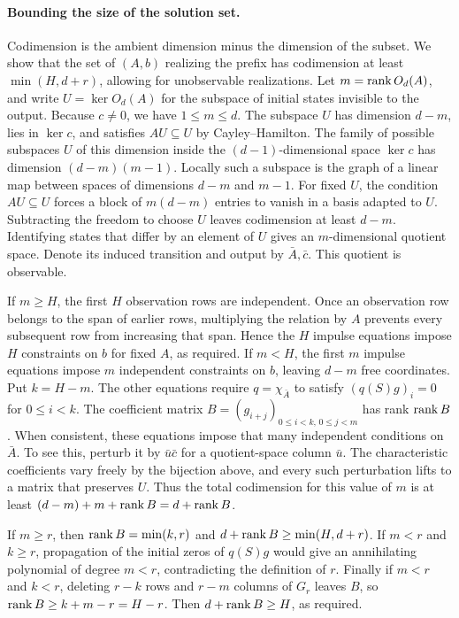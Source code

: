 \paragraph{Bounding the size of the solution set.}
Codimension is the ambient dimension minus the dimension of the subset. We show that the set of \((A,b)\) realizing the prefix has codimension at least \(\min(H,d+r)\), allowing for unobservable realizations. Let \(m=\operatorname{rank} O_d(A)\), and write \(U=\ker O_d(A)\) for the subspace of initial states invisible to the output. Because \(c\ne0\), we have \(1\le m\le d\). The subspace \(U\) has dimension \(d-m\), lies in \(\ker c\), and satisfies \(AU\subseteq U\) by Cayley--Hamilton. The family of possible subspaces \(U\) of this dimension inside the \((d-1)\)-dimensional space \(\ker c\) has dimension \((d-m)(m-1)\). Locally such a subspace is the graph of a linear map between spaces of dimensions \(d-m\) and \(m-1\). For fixed \(U\), the condition \(AU\subseteq U\) forces a block of \(m(d-m)\) entries to vanish in a basis adapted to \(U\). Subtracting the freedom to choose \(U\) leaves codimension at least \(d-m\). Identifying states that differ by an element of \(U\) gives an \(m\)-dimensional quotient space. Denote its induced transition and output by \(\bar A,\bar c\). This quotient is observable.

If \(m\ge H\), the first \(H\) observation rows are independent. Once an observation row belongs to the span of earlier rows, multiplying the relation by \(A\) prevents every subsequent row from increasing that span. Hence the \(H\) impulse equations impose \(H\) constraints on \(b\) for fixed \(A\), as required. If \(m<H\), the first \(m\) impulse equations impose \(m\) independent constraints on \(b\), leaving \(d-m\) free coordinates. Put \(k=H-m\). The other equations require \(q=\chi_{\bar A}\) to satisfy \((q(S)g)_i=0\) for \(0\le i<k\). The coefficient matrix \(B=(g_{i+j})_{0\le i<k,\,0\le j<m}\) has rank \(\operatorname{rank} B\). When consistent, these equations impose that many independent conditions on \(\bar A\). To see this, perturb it by \(\bar u\bar c\) for a quotient-space column \(\bar u\). The characteristic coefficients vary freely by the bijection above, and every such perturbation lifts to a matrix that preserves \(U\). Thus the total codimension for this value of \(m\) is at least \((d-m)+m+\operatorname{rank} B=d+\operatorname{rank} B\).

If \(m\ge r\), then \(\operatorname{rank} B=\min(k,r)\) and \(d+\operatorname{rank} B\ge\min(H,d+r)\). If \(m<r\) and \(k\ge r\), propagation of the initial zeros of \(q(S)g\) would give an annihilating polynomial of degree \(m<r\), contradicting the definition of \(r\). Finally if \(m<r\) and \(k<r\), deleting \(r-k\) rows and \(r-m\) columns of \(G_r\) leaves \(B\), so \(\operatorname{rank} B\ge k+m-r=H-r\). Then \(d+\operatorname{rank} B\ge H\), as required.

